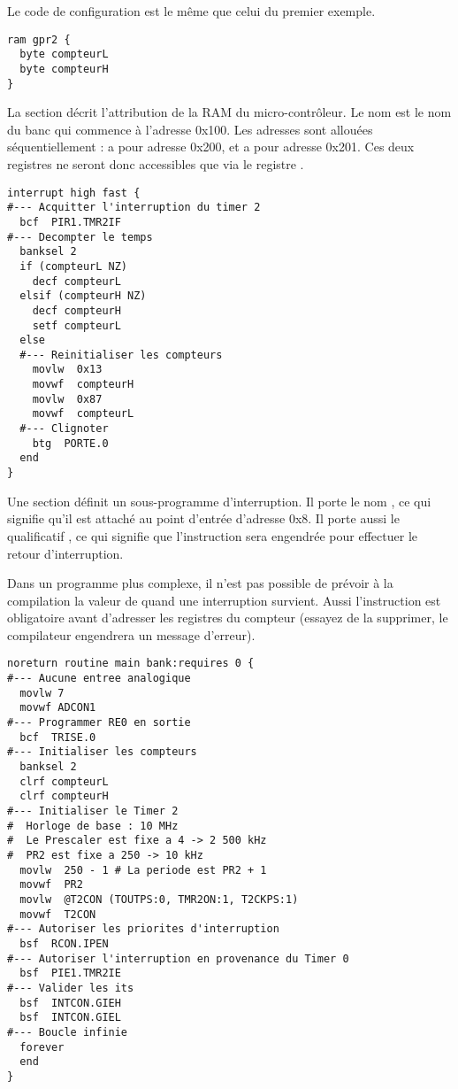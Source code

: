 Le code de configuration est le même que celui du premier exemple.


\begin{lstlisting}[language=piccolo]
ram gpr2 {
  byte compteurL
  byte compteurH
}
\end{lstlisting}
La section  décrit l’attribution de la RAM du micro-contrôleur. Le nom  est le nom du banc qui commence à l’adresse 0x100. Les adresses sont allouées séquentiellement :  a pour adresse 0x200, et  a pour adresse 0x201. Ces deux registres ne seront donc accessibles que via le registre .


\begin{lstlisting}[language=piccolo]
interrupt high fast {
#--- Acquitter l'interruption du timer 2 
  bcf  PIR1.TMR2IF 
#--- Decompter le temps
  banksel 2 
  if (compteurL NZ)
    decf compteurL
  elsif (compteurH NZ)
    decf compteurH
    setf compteurL
  else
  #--- Reinitialiser les compteurs
    movlw  0x13
    movwf  compteurH
    movlw  0x87
    movwf  compteurL
  #--- Clignoter
    btg  PORTE.0
  end
}
\end{lstlisting}
Une section  définit un sous-programme d’interruption. Il porte le nom , ce qui signifie qu’il est attaché au point d’entrée d’adresse 0x8. Il porte aussi le qualificatif , ce qui signifie que l’instruction  sera engendrée pour effectuer le retour d’interruption.

Dans un programme plus complexe, il n’est pas possible de prévoir à la compilation la valeur de  quand une interruption survient. Aussi l’instruction  est obligatoire avant d’adresser les registres du compteur (essayez de la supprimer, le compilateur engendrera un message d'erreur).

\begin{lstlisting}[language=piccolo]
noreturn routine main bank:requires 0 {
#--- Aucune entree analogique
  movlw 7
  movwf ADCON1
#--- Programmer RE0 en sortie
  bcf  TRISE.0
#--- Initialiser les compteurs
  banksel 2
  clrf compteurL
  clrf compteurH
#--- Initialiser le Timer 2
#  Horloge de base : 10 MHz
#  Le Prescaler est fixe a 4 -> 2 500 kHz
#  PR2 est fixe a 250 -> 10 kHz
  movlw  250 - 1 # La periode est PR2 + 1
  movwf  PR2
  movlw  @T2CON (TOUTPS:0, TMR2ON:1, T2CKPS:1)
  movwf  T2CON  
#--- Autoriser les priorites d'interruption
  bsf  RCON.IPEN
#--- Autoriser l'interruption en provenance du Timer 0
  bsf  PIE1.TMR2IE
#--- Valider les its
  bsf  INTCON.GIEH
  bsf  INTCON.GIEL
#--- Boucle infinie
  forever
  end
}
\end{lstlisting}


